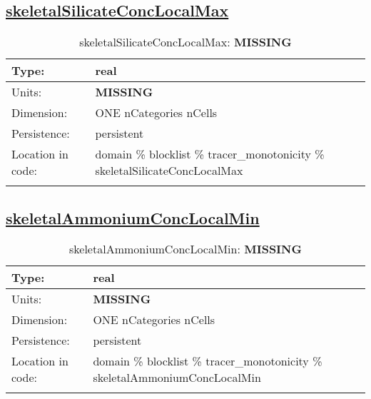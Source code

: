 \subsection[skeletalSilicateConcLocalMax]{\hyperref[sec:var_tab_tracer_monotonicity]{skeletalSilicateConcLocalMax}}
\label{subsec:var_sec_tracer_monotonicity_skeletalSilicateConcLocalMax}
\begin{center}
\begin{longtable}{| p{2.0in} | p{4.0in} |}
        \hline 
        Type: & real \\
        \hline 
        Units: & {\bf \color{red} MISSING} \\
        \hline 
        Dimension: & ONE nCategories nCells \\
        \hline 
        Persistence: & persistent \\
        \hline 
         Location in code: & domain \% blocklist \% tracer\_monotonicity \% skeletalSilicateConcLocalMax \\
         \hline 
    \caption{skeletalSilicateConcLocalMax: {\bf \color{red} MISSING}}
\end{longtable}
\end{center}
\subsection[skeletalAmmoniumConcLocalMin]{\hyperref[sec:var_tab_tracer_monotonicity]{skeletalAmmoniumConcLocalMin}}
\label{subsec:var_sec_tracer_monotonicity_skeletalAmmoniumConcLocalMin}
\begin{center}
\begin{longtable}{| p{2.0in} | p{4.0in} |}
        \hline 
        Type: & real \\
        \hline 
        Units: & {\bf \color{red} MISSING} \\
        \hline 
        Dimension: & ONE nCategories nCells \\
        \hline 
        Persistence: & persistent \\
        \hline 
         Location in code: & domain \% blocklist \% tracer\_monotonicity \% skeletalAmmoniumConcLocalMin \\
         \hline 
    \caption{skeletalAmmoniumConcLocalMin: {\bf \color{red} MISSING}}
\end{longtable}
\end{center}
